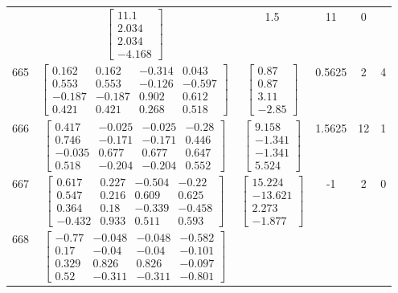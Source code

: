 \documentclass[a4paper,12pt]{article}
\begin{document}
\begin{tabular}{c c c c c c}
&
$\begin{bmatrix} 11.1 \\ 2.034 \\ 2.034 \\ -4.168 \end{bmatrix}$
&
1.5
&
11
&
0
\\
665
&
$\begin{bmatrix} 0.162 & 0.162 & -0.314 & 0.043 \\ 0.553 & 0.553 & -0.126 & -0.597 \\ -0.187 & -0.187 & 0.902 & 0.612 \\ 0.421 & 0.421 & 0.268 & 0.518 \end{bmatrix}$
&
$\begin{bmatrix} 0.87 \\ 0.87 \\ 3.11 \\ -2.85 \end{bmatrix}$
&
0.5625
&
2
&
4
\\
666
&
$\begin{bmatrix} 0.417 & -0.025 & -0.025 & -0.28 \\ 0.746 & -0.171 & -0.171 & 0.446 \\ -0.035 & 0.677 & 0.677 & 0.647 \\ 0.518 & -0.204 & -0.204 & 0.552 \end{bmatrix}$
&
$\begin{bmatrix} 9.158 \\ -1.341 \\ -1.341 \\ 5.524 \end{bmatrix}$
&
1.5625
&
12
&
1
\\
667
&
$\begin{bmatrix} 0.617 & 0.227 & -0.504 & -0.22 \\ 0.547 & 0.216 & 0.609 & 0.625 \\ 0.364 & 0.18 & -0.339 & -0.458 \\ -0.432 & 0.933 & 0.511 & 0.593 \end{bmatrix}$
&
$\begin{bmatrix} 15.224 \\ -13.621 \\ 2.273 \\ -1.877 \end{bmatrix}$
&
-1
&
2
&
0
\\
668
&
$\begin{bmatrix} -0.77 & -0.048 & -0.048 & -0.582 \\ 0.17 & -0.04 & -0.04 & -0.101 \\ 0.329 & 0.826 & 0.826 & -0.097 \\ 0.52 & -0.311 & -0.311 & -0.801 \end{bmatrix}$

\end{tabular}
\end{document}
